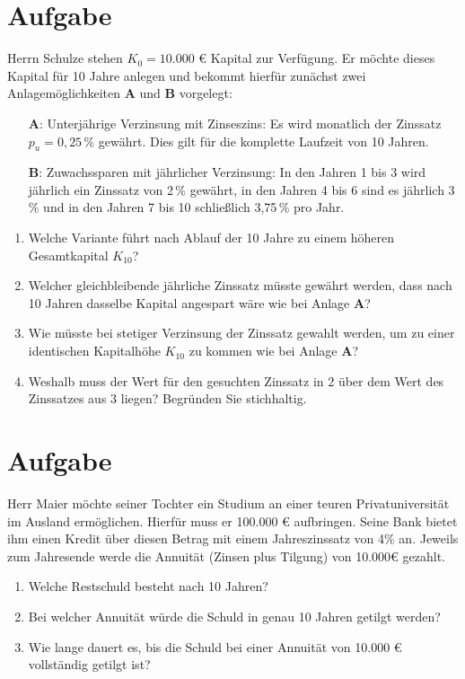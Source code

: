 \documentclass[fontsize=11pt, parskip=half]{scrartcl}
\begin{document}
    
    \section{Aufgabe}
    Herrn Schulze stehen $K_0 = 10.000$ € Kapital zur
    Verfügung. Er möchte dieses Kapital für 10 Jahre anlegen und bekommt
    hierfür zunächst zwei Anlagemöglichkeiten \textbf{A} und \textbf{B}
    vorgelegt:
    \begin{itemize}
    \item[\textbf{A}:] Unterjährige Verzinsung mit Zinseszins: Es wird monatlich der Zinssatz $p_u=0,25$\,\% gewährt. Dies gilt für die komplette Laufzeit von 10 Jahren.
    \item[\textbf{B}:] Zuwachssparen mit jährlicher Verzinsung: In den
    Jahren 1 bis 3 wird jährlich ein Zinssatz von 2\,\% gewährt, in den
    Jahren 4 bis 6 sind es jährlich 3\,\% und in den Jahren 7 bis 10
    schlie{\ss}lich 3,75\,\% pro Jahr.
    \end{itemize}
    
    \begin{enumerate}
    \item Welche Variante führt nach Ablauf der 10 Jahre zu einem höheren Gesamtkapital $K_{10}$?
    \item Welcher gleichbleibende jährliche Zinssatz müsste gewährt werden, dass nach 10 Jahren dasselbe Kapital angespart wäre wie bei Anlage \textbf{A}?
    \item Wie müsste bei stetiger Verzinsung der Zinssatz gewahlt werden, um zu einer identischen Kapitalhöhe $K_{10}$ zu kommen wie bei Anlage \textbf{A}?
    \item Weshalb muss der Wert für den gesuchten Zinssatz in 2 über dem Wert des Zinssatzes aus 3 liegen? Begründen Sie stichhaltig.\\
    \end{enumerate}
    

    
    \section{Aufgabe}
    Herr Maier möchte seiner Tochter ein Studium an einer teuren
    Privatuniversität im Ausland ermöglichen. Hierfür muss er 100.000
   € aufbringen. Seine Bank bietet ihm einen Kredit über diesen
    Betrag mit einem Jahreszinssatz von 4\% an. Jeweils zum Jahresende
    werde die Annuität (Zinsen plus Tilgung) von 10.000€ gezahlt.
    \begin{enumerate}
    \item Welche Restschuld besteht nach 10 Jahren? %
    \item Bei welcher Annuität würde die Schuld in genau 10 Jahren
    getilgt werden?
    \item Wie lange dauert es, bis die Schuld bei einer Annuität von 10.000 € vollständig getilgt
    ist?
    \end{enumerate}
    
\end{document}
